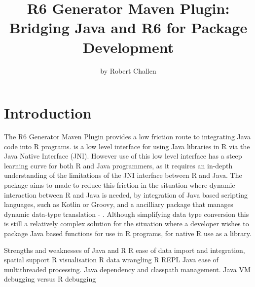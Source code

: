\title{R6 Generator Maven Plugin: Bridging Java and R6 for Package Development}
\author{by Robert Challen}

\maketitle


\hypertarget{introduction}{%
\section{Introduction}\label{introduction}}

The R6 Generator Maven Plugin provides a low friction route to
integrating Java code into R programs.  is a low level
interface for using Java libraries in R via the Java Native Interface
(JNI). However use of this low level interface has a steep learning
curve for both R and Java programmers, as it requires an in-depth
understanding of the limitations of the JNI interface between R and
Java. The  package aims to made to reduce this friction
in the situation where dynamic interaction between R and Java is needed,
by integration of Java based scripting languages, such as Kotlin or
Groovy, and a ancilliary package that manages dynamic data-type
translation - . Although simplifying data type conversion
this is still a relatively complex solution for the situation where a
developer wishes to package Java based functions for use in R programs,
for native R use as a library.

Strengths and weaknesses of Java and R R ease of data import and
integration, spatial support R visualisation R data wrangling R REPL
Java ease of multithreaded processing. Java dependency and classpath
management. Java VM debugging versus R debugging

